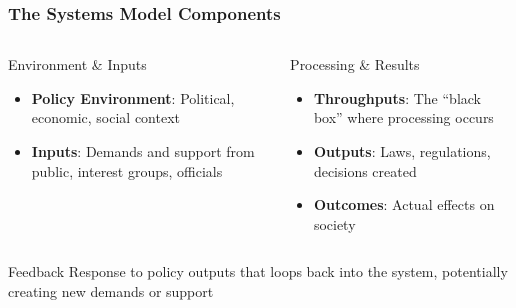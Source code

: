 \documentclass[10pt]{beamer}
\begin{document}
\begin{frame}
\frametitle{The Systems Model Components}

\begin{columns}
\begin{column}{0.48\textwidth}
\begin{block}{Environment \& Inputs}
\pause
\begin{itemize}
\item \textbf{Policy Environment}: Political, economic, social context
\item \textbf{Inputs}: Demands and support from public, interest groups, officials
\end{itemize}
\end{block}
\end{column}

\begin{column}{0.48\textwidth}
\begin{block}{Processing \& Results}
\pause
\begin{itemize}
\item \textbf{Throughputs}: The ``black box'' where processing occurs
\item \textbf{Outputs}: Laws, regulations, decisions created
\item \textbf{Outcomes}: Actual effects on society
\end{itemize}
\end{block}
\end{column}
\end{columns}

\pause
\vspace{0.3cm}
\begin{block}{Feedback}
Response to policy outputs that loops back into the system, potentially creating new demands or support
\end{block}

\end{frame}
\end{document}
